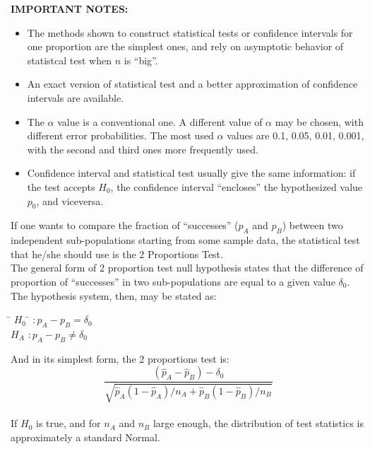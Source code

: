 \begin{frame}
  \textbf{IMPORTANT NOTES:}
  \begin{itemize}
    \item The methods shown to construct statistical tests or confidence intervals for one proportion are the simplest ones, and rely on asymptotic behavior of statistcal test when $n$ is ``big''.\\
    \item An exact version of statistical test and a better approximation of confidence intervals are available.
    \item The $\alpha$ value is a conventional one. A different value of $\alpha$ may be chosen, with different error probabilities. The most used $\alpha$ values are 0.1, 0.05, 0.01, 0.001, with the second and third ones more frequently used.
    \item Confidence interval and statistical test usually give the same information: if the test accepts $H_0$, the confidence interval ``encloses'' the hypothesized value $p_0$, and viceversa.
  \end{itemize}
\end{frame}


\begin{frame}
  If one wants to compare the fraction of ``successes'' ($ p_A $ and $ p_B $) between two independent sub-populations starting from some sample data, the statistical test that he/she should use is the 2 Proportions Test.\\
  The general form of 2 proportion test null hypothesis states that the difference of proportion of ``successes'' in two sub-populations are equal to a given value $\delta_0$. The hypothesis system, then, may be stated as:\\
  \vspace{-0.15cm}
  \begin{tabbing}
    \=  $ H_0 $ \= $ :  p_A - p_B = \delta_0$\\
    \>  $ H_A $ \> $ :  p_A - p_B \neq \delta_0$\\
  \end{tabbing}
  \vspace{-1cm}
  And in its simplest form, the 2 proportions test is:
  $$ \frac{(\hat{p}_A - \hat{p}_B)-\delta_0}{\sqrt{\hat{p}_A (1 - \hat{p}_A) / n_A + \hat{p}_B (1 - \hat{p}_B) / n_B}} $$\\
  \vspace{-0.15cm}
  If $ H_0 $ is true, and for $ n_A $ and $ n_B $ large enough, the distribution of test statistics is approximately a standard Normal.
\end{frame}

